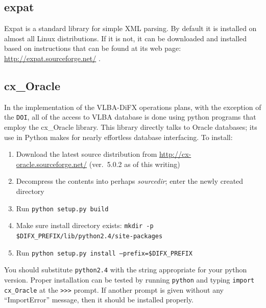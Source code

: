 
\subsection{expat} \label{sec:expat}

Expat is a standard library for simple XML parsing.
By default it is installed on almost all Linux distributions.
If it is not, it can be downloaded and installed based on instructions that can be found at its web page:
\url{http://expat.sourceforge.net/} .









\subsection{cx\_Oracle} \label{sec:cxOracle}

In the implementation of the VLBA-DiFX operations plans, with the exception of the {\tt DOI}, all of the access to VLBA database is done using python programs that employ the cx\_Oracle library.
This library directly talks to Oracle databases; its use in Python makes for nearly effortless database interfacing.
To install:
\begin{enumerate}
\item Download the latest source distribution from \url{http://cx-oracle.sourceforge.net/} (ver.\ 5.0.2 as of this writing)
\item Decompress the contents into perhaps {\em sourcedir}; enter the newly created directory
\item Run {\tt python setup.py build}
\item Make sure install directory exists:  {\tt mkdir -p \$DIFX\_PREFIX/lib/python2.4/site-packages}
\item Run {\tt python setup.py install --prefix=\$DIFX\_PREFIX}
\end{enumerate}

\noindent
You should substitute {\tt python2.4} with the string appropriate for your python version.
Proper installation can be tested by running {\tt python} and typing {\tt import cx\_Oracle} at the {\tt >>>} prompt.
If another prompt is given without any ``ImportError'' message, then it should be installed properly.







